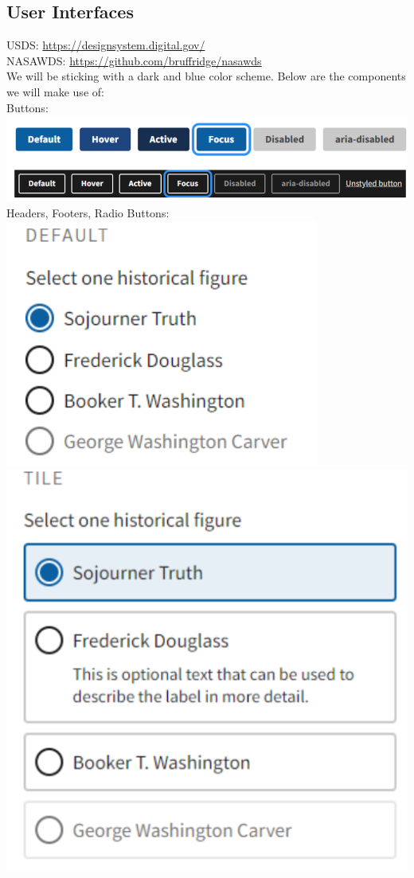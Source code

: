 \documentclass{article}
\begin{document}
\subsection{User Interfaces}
USDS: \href{https://designsystem.digital.gov/}{https://designsystem.digital.gov/} \\
NASAWDS: \href{https://github.com/bruffridge/nasawds}{https://github.com/bruffridge/nasawds} \\
We will be sticking with a dark and blue color scheme. Below are the components we will make use of: \\
Buttons: \\
\includegraphics{buttons} \\
Headers, Footers, Radio Buttons: \\
\includegraphics{headers} \\
\includegraphics{footers} \\
\end{document}
